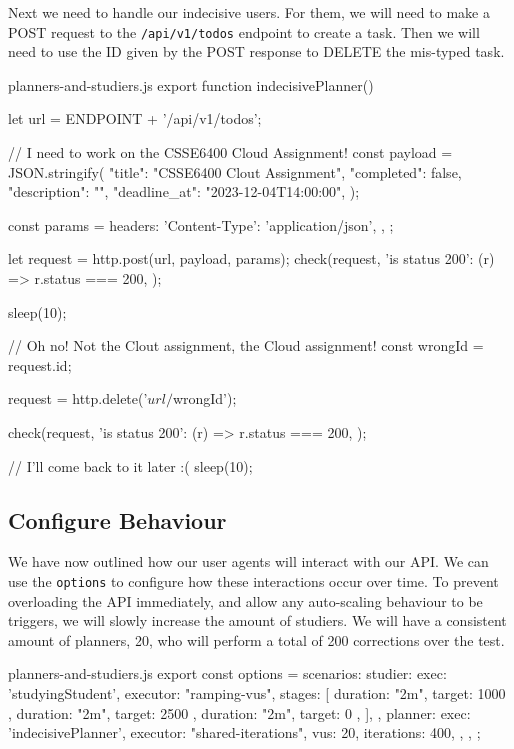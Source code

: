 \documentclass{csse4400}
\begin{document}
Next we need to handle our indecisive users.
For them, we will need to make a POST request to the \texttt{/api/v1/todos} endpoint to create a task.
Then we will need to use the ID given by the POST response to DELETE the mis-typed task.

\begin{code}[language=JavaScript,numbers=none]{planners-and-studiers.js}
export function indecisivePlanner() {
    let url = ENDPOINT + '/api/v1/todos';

    // I need to work on the CSSE6400 Cloud Assignment!
    const payload = JSON.stringify({
        "title": "CSSE6400 Clout Assignment",
        "completed": false,
        "description": "",
        "deadline_at": "2023-12-04T14:00:00",
    });

    const params = {
        headers: {
            'Content-Type': 'application/json',
        },
    };

    let request = http.post(url, payload, params);
    check(request, {
        'is status 200': (r) => r.status === 200,
    });

    sleep(10);

    // Oh no! Not the Clout assignment, the Cloud assignment!
    const wrongId = request.id;

    request = http.delete('${url}/${wrongId}');

    check(request, {
        'is status 200': (r) => r.status === 200,
    });

    // I'll come back to it later :(
    sleep(10);
}
\end{code}

\subsection{Configure Behaviour}

We have now outlined how our user agents will interact with our API.
We can use the \texttt{options} to configure how these interactions occur over time.
To prevent overloading the API immediately,
and allow any auto-scaling behaviour to be triggers,
we will slowly increase the amount of studiers.
We will have a consistent amount of planners, 20,
who will perform a total of 200 corrections over the test.

\begin{code}[language=JavaScript,numbers=none]{planners-and-studiers.js}
export const options = {
    scenarios: {
        studier: {
            exec: 'studyingStudent',
            executor: "ramping-vus",
            stages: [
                { duration: "2m", target: 1000 },
                { duration: "2m", target: 2500 },
                { duration: "2m", target: 0 },
            ],
        },
        planner: {
            exec: 'indecisivePlanner',
            executor: "shared-iterations",
            vus: 20,
            iterations: 400,
        },
    },
};
\end{code}
\end{document}
